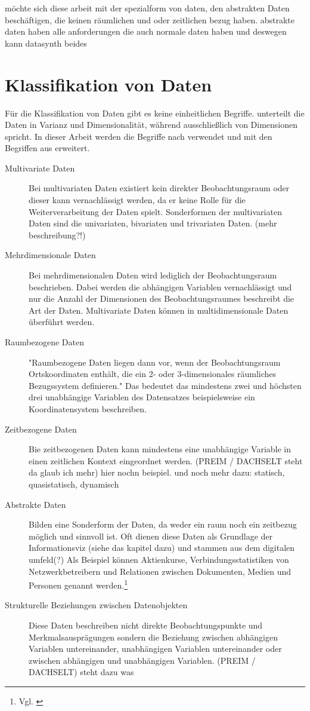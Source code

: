 \documentclass[a4paper, 12pt, DIVcalc, onepage, pdftex, headsepline, footsepline]{scrreprt}
\begin{document}
möchte sich diese arbeit mit der spezialform von daten, den abstrakten Daten beschäftigen, die keinen räumlichen
und oder zeitlichen bezug haben.
abstrakte daten haben alle anforderungen die auch normale daten haben und deswegen kann datasynth beides

\section{Klassifikation von Daten}
\label{sec:KlassifikationDaten}
Für die Klassifikation von Daten gibt es keine einheitlichen Begriffe. \citep{Schumann} unterteilt die Daten
in Varianz und Dimensionalität, während \citep{Preim} ausschließlich von Dimensionen spricht.
In dieser Arbeit werden die Begriffe nach \citep{Schumann} verwendet und mit den Begriffen aus \citep{Preim}
erweitert.
\begin{description}
\item[Multivariate Daten]
Bei multivariaten Daten existiert kein direkter Beobachtungsraum oder dieser kann vernachlässigt werden, da er
keine Rolle für die Weiterverarbeitung der Daten spielt. Sonderformen der multivariaten Daten sind die univariaten,
bivariaten und trivariaten Daten. (mehr beschreibung?!)
\item[Mehrdimensionale Daten]
Bei mehrdimensionalen Daten wird lediglich der Beobachtungsraum beschrieben. Dabei werden die abhängigen Variablen
vernachlässigt und nur die Anzahl der Dimensionen des Beobachtungsraumes beschreibt die Art der Daten.
Multivariate Daten können in multidimensionale Daten überführt werden.
\item[Raumbezogene Daten]
"Raumbezogene Daten liegen dann vor, wenn der Beobachtungsraum Ortskoordinaten enthält,
die ein 2- oder 3-dimensionales räumliches Bezugssystem definieren."\citep[S.\,219]{Schumann}
Das bedeutet das mindestens zwei und höchsten drei unabhängige Variablen des Datensatzes beispielsweise
ein Koordinatensystem beschreiben.
\item[Zeitbezogene Daten]
Bie zeitbezogenen Daten kann mindestens eine unabhängige Variable in einen zeitlichen Kontext eingeordnet werden.
(PREIM / DACHSELT steht da glaub ich mehr) hier nochn beispiel.
und noch mehr dazu: statisch, quasistatisch, dynamisch
\item[Abstrakte Daten]
Bilden eine Sonderform der Daten, da weder ein raum noch ein zeitbezug möglich und sinnvoll ist. Oft dienen diese
Daten als Grundlage der Informationsviz (siehe das kapitel dazu) und stammen aus dem digitalen umfeld(?)
Als Beispiel können Aktienkurse, Verbindungsstatistiken von Netzwerkbetreibern und Relationen zwischen
Dokumenten, Medien und Personen genannt werden.\footnote{Vgl. \citep{Preim}}
\item[Strukturelle Beziehungen zwischen Datenobjekten]
Diese Daten beschreiben nicht direkte Beobachtungspunkte und Merkmalsausprägungen sondern die Beziehung zwischen
abhängigen Variablen untereinander, unabhängigen Variablen untereinander oder zwischen abhängigen und unabhängigen
Variablen.
(PREIM / DACHSELT) steht dazu was
\end{description}
\end{document}
